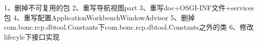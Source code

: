 1、删掉不可复用的包
2、重写导航视图part
3、重写doc+OSGI-INF文件+services包
4、重写配置ApplicationWorkbenchWindowAdvisor
5、删掉com.bonc.rcp.dbtool.Constants下com.bonc.rcp.dbtool.Constants之外的类
6、修改lifecyle下接口实现